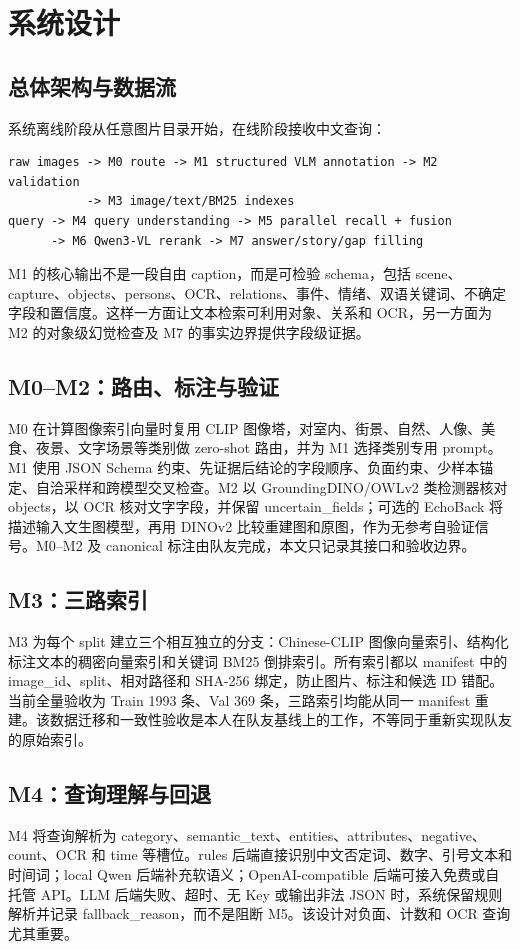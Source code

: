 \documentclass[UTF8,11pt,a4paper]{ctexart}
\begin{document}
\section{系统设计}
\subsection{总体架构与数据流}
系统离线阶段从任意图片目录开始，在线阶段接收中文查询：
\begin{verbatim}
raw images -> M0 route -> M1 structured VLM annotation -> M2 validation
           -> M3 image/text/BM25 indexes
query -> M4 query understanding -> M5 parallel recall + fusion
      -> M6 Qwen3-VL rerank -> M7 answer/story/gap filling
\end{verbatim}
M1 的核心输出不是一段自由 caption，而是可检验 schema，包括 scene、capture、objects、persons、OCR、relations、事件、情绪、双语关键词、不确定字段和置信度。这样一方面让文本检索可利用对象、关系和 OCR，另一方面为 M2 的对象级幻觉检查及 M7 的事实边界提供字段级证据。
\subsection{M0--M2：路由、标注与验证}
M0 在计算图像索引向量时复用 CLIP 图像塔，对室内、街景、自然、人像、美食、夜景、文字场景等类别做 zero-shot 路由，并为 M1 选择类别专用 prompt。M1 使用 JSON Schema 约束、先证据后结论的字段顺序、负面约束、少样本锚定、自洽采样和跨模型交叉检查。M2 以 GroundingDINO/OWLv2 类检测器核对 objects，以 OCR 核对文字字段，并保留 uncertain\_fields；可选的 EchoBack 将描述输入文生图模型，再用 DINOv2 比较重建图和原图，作为无参考自验证信号。M0--M2 及 canonical 标注由队友完成，本文只记录其接口和验收边界。
\subsection{M3：三路索引}
M3 为每个 split 建立三个相互独立的分支：Chinese-CLIP 图像向量索引、结构化标注文本的稠密向量索引和关键词 BM25 倒排索引。所有索引都以 manifest 中的 image\_id、split、相对路径和 SHA-256 绑定，防止图片、标注和候选 ID 错配。当前全量验收为 Train 1993 条、Val 369 条，三路索引均能从同一 manifest 重建。该数据迁移和一致性验收是本人在队友基线上的工作，不等同于重新实现队友的原始索引。
\subsection{M4：查询理解与回退}
M4 将查询解析为 category、semantic\_text、entities、attributes、negative、count、OCR 和 time 等槽位。rules 后端直接识别中文否定词、数字、引号文本和时间词；local Qwen 后端补充软语义；OpenAI-compatible 后端可接入免费或自托管 API。LLM 后端失败、超时、无 Key 或输出非法 JSON 时，系统保留规则解析并记录 fallback\_reason，而不是阻断 M5。该设计对负面、计数和 OCR 查询尤其重要。
\end{document}
